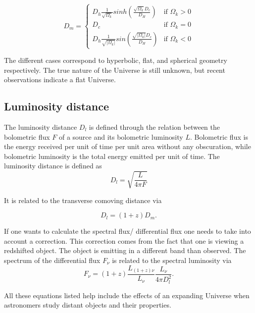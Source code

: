 $$
D_m =
\begin{cases}
  D_h\frac{1}{\sqrt{\Omega_k}}sinh(\frac{\sqrt{\Omega_k}D_c}{D_H}) & \text{if } \Omega_k > 0 \\
  D_c& \text{if } \Omega_k = 0 \\
  D_h\frac{1}{\sqrt{|\Omega_k|}}sin(\frac{\sqrt{|\Omega_k|}D_c}{D_H}) & \text{if } \Omega_k < 0
\end{cases}
$$

The different cases correspond to hyperbolic, flat, and spherical geometry respectively. The true nature 
of the Universe is still unknown, but recent observations indicate a flat Universe. 








\subsection{Luminosity distance}
The luminosity distance $D_l$ is defined through the relation between 
the bolometric flux $F$ of a source and its bolometric luminosity $L$. Bolometric flux is the energy received per unit of time per unit area without any obscuration, while bolometric luminosity is the total energy emitted per unit of time.
The luminosity distance is defined as
\begin{equation}    
    D_l = \sqrt{\frac{L}{4\pi F}}
\end{equation}


It is related to the transverse comoving distance via 

\begin{equation}
    D_l = (1+z)D_m.
\end{equation}

If one wants to calculate the spectral 
flux/ differential flux one needs to take into account a correction. This correction comes 
from the fact that one is viewing a redshifted object. The object is emitting in a different band than 
observed. The spectrum of the differential flux $F_\nu$ is related to the spectral luminosity via
\begin{equation}
    F_\nu = (1+z) \frac{L_{(1+z)\nu}}{L_\nu}\frac{L_\nu}{4\pi D_l^2}.
\end{equation}


All these equations listed help include the effects of an expanding Universe when astronomers study distant objects and their properties.
